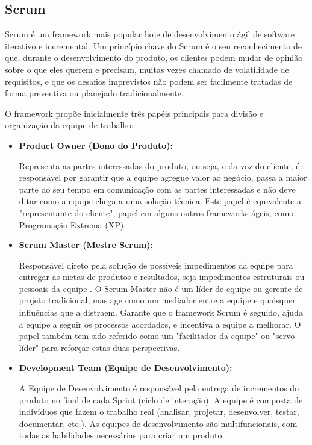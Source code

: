 \subsection{Scrum}
\par Scrum é um framework mais popular hoje de desenvolvimento ágil de software iterativo e incremental. Um princípio chave do Scrum é o seu reconhecimento de que, durante o desenvolvimento do produto, os clientes podem mudar de opinião sobre o que eles querem e precisam, muitas vezes chamado de volatilidade de requisitos, e que os desafios imprevistos não podem ser facilmente tratadas de forma preventiva ou planejado tradicionalmente.
\par O framework propõe inicialmente três papéis principais para divisão e organização da equipe de trabalho:
\begin{itemize}
\item\textbf{Product Owner (Dono do Produto):}
\par Representa as partes interessadas do produto, ou seja, e da voz do cliente, é responsável por garantir que a equipe agregue valor ao negócio, passa a maior parte do seu tempo em comunicação com as partes interessadas e não deve ditar como a equipe chega a uma solução técnica. Este papel é equivalente a "representante do cliente", papel em alguns outros frameworks ágeis, como Programação Extrema (XP).
\item\textbf{Scrum Master (Mestre Scrum):}
\par Responsável direto pela solução de possíveis impedimentos da equipe para entregar as metas de produtos e resultados, seja impedimentos estruturais ou pessoais da equipe . O Scrum Master não é um líder de equipe ou gerente de projeto tradicional, mas age como um mediador entre a equipe e quaisquer influências que a distraem. Garante que o framework Scrum é seguido, ajuda a equipe a seguir os processos acordados, e incentiva a equipe a melhorar. O papel também tem sido referido como um "facilitador da equipe" ou "servo-líder" para reforçar estas duas perspectivas.
\item\textbf{Development Team (Equipe de Desenvolvimento):}
\par A Equipe de Desenvolvimento é responsável pela entrega de incrementos do produto no final de cada Sprint (ciclo de interação). A equipe é composta de indivíduos que fazem o trabalho real (analisar, projetar, desenvolver, testar, documentar, etc.). As equipes de desenvolvimento são multifuncionais, com todas as habilidades necessárias para criar um produto.
\end{itemize}
